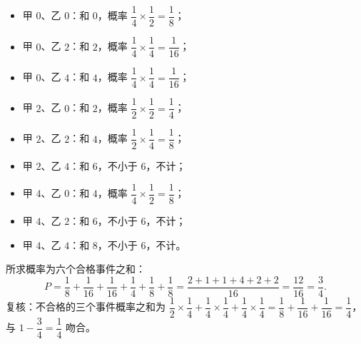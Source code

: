 \begin{answer}
\begin{itemize}
\item 甲 $0$、乙 $0$：和 $0$，概率 $\dfrac14\times\dfrac12=\dfrac18$；
\item 甲 $0$、乙 $2$：和 $2$，概率 $\dfrac14\times\dfrac14=\dfrac1{16}$；
\item 甲 $0$、乙 $4$：和 $4$，概率 $\dfrac14\times\dfrac14=\dfrac1{16}$；
\item 甲 $2$、乙 $0$：和 $2$，概率 $\dfrac12\times\dfrac12=\dfrac14$；
\item 甲 $2$、乙 $2$：和 $4$，概率 $\dfrac12\times\dfrac14=\dfrac18$；
\item 甲 $2$、乙 $4$：和 $6$，不小于 $6$，不计；
\item 甲 $4$、乙 $0$：和 $4$，概率 $\dfrac14\times\dfrac12=\dfrac18$；
\item 甲 $4$、乙 $2$：和 $6$，不小于 $6$，不计；
\item 甲 $4$、乙 $4$：和 $8$，不小于 $6$，不计。
\end{itemize}

所求概率为六个合格事件之和：
\nopagebreak[4]
\[
P=\frac18+\frac1{16}+\frac1{16}+\frac14+\frac18+\frac18
=\frac{2+1+1+4+2+2}{16}=\frac{12}{16}=\frac34.
\]
复核：不合格的三个事件概率之和为 $\dfrac12\times\dfrac14+\dfrac14\times\dfrac14+\dfrac14\times\dfrac14=\dfrac18+\dfrac1{16}+\dfrac1{16}=\dfrac14$，与 $1-\dfrac34=\dfrac14$ 吻合。



\end{answer}
